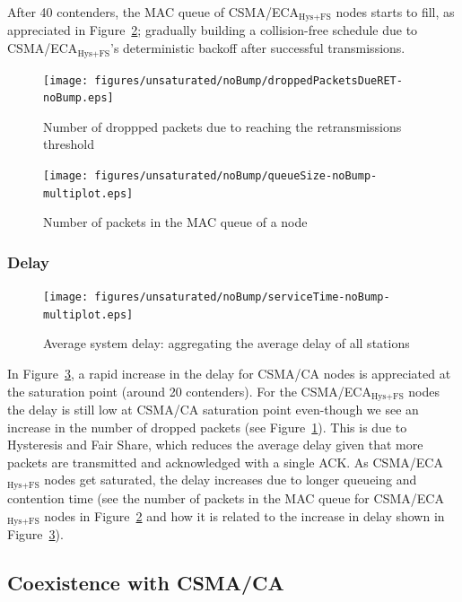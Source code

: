 \documentclass[a4paper,journal]{IEEEtran}
\begin{document}
	After 40 contenders, the MAC queue of CSMA/ECA$_{\text{Hys+FS}}$ nodes starts to fill, as appreciated in Figure~\ref{fig:MacQ}; gradually building a collision-free schedule due to CSMA/ECA$_{\text{Hys+FS}}$'s deterministic backoff after successful transmissions.
	
   	\begin{figure}[tb]
		\centering
		\texttt{[image: figures/unsaturated/noBump/droppedPacketsDueRET-noBump.eps]}
		\caption{Number of droppped packets due to reaching the retransmissions threshold}
		\label{fig:droppedDueToRET}
	\end{figure}
	
	 \begin{figure}[tb]
		\centering
		\texttt{[image: figures/unsaturated/noBump/queueSize-noBump-multiplot.eps]}
		\caption{Number of packets in the MAC queue of a node}
		\label{fig:MacQ}
	\end{figure}
	
	\subsubsection{Delay}
	
	\begin{figure}[tb]
		\centering
		\texttt{[image: figures/unsaturated/noBump/serviceTime-noBump-multiplot.eps]}
		\caption{Average system delay: aggregating the average delay of all stations}
		\label{fig:serviceTime-unsat}
	\end{figure}
	
	In Figure~\ref{fig:serviceTime-unsat}, a rapid increase in the delay for CSMA/CA nodes is appreciated at the saturation point (around 20 contenders). For the CSMA/ECA$_{\text{Hys+FS}}$ nodes the delay is still low at CSMA/CA saturation point even-though we see an increase in the number of dropped packets (see Figure~\ref{fig:droppedDueToRET}). This is due to Hysteresis and Fair Share, which reduces the average delay given that more packets are transmitted and acknowledged with a single ACK. As CSMA/ECA$_{\text{Hys+FS}}$ nodes get saturated, the delay increases due to longer queueing and contention time (see the number of packets in the MAC queue for CSMA/ECA$_{\text{Hys+FS}}$ nodes in Figure~\ref{fig:MacQ} and how it is related to the increase in delay shown in Figure~\ref{fig:serviceTime-unsat}).\\	

	\subsection{Coexistence with CSMA/CA}\label{coexistance-w-csmaca}
	
\end{document}
